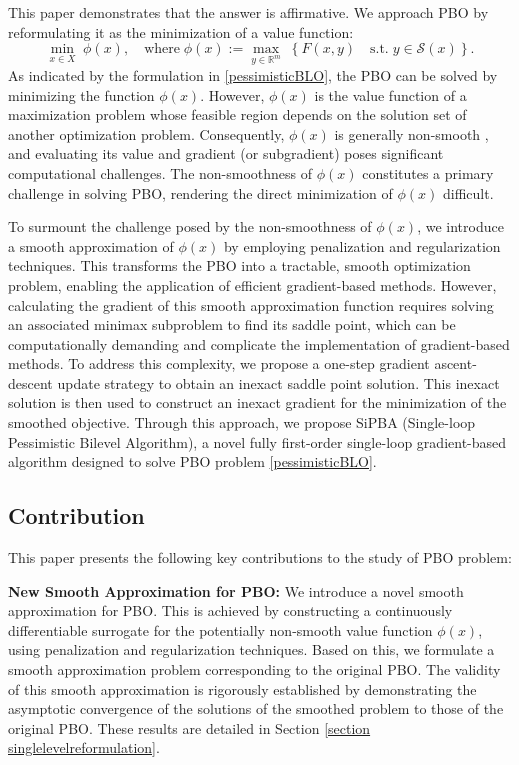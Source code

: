 \documentclass{article}
\def\x{x}
\begin{document}
This paper demonstrates that the answer is affirmative. We approach PBO by reformulating it as the minimization of a value function:
\begin{equation}\label{pessimisticBLO}
		\min_{x \in {X}} \; \phi(x), \quad \text{where} \; \phi(x) := \max_{y\in \mathbb{R}^m}\; \left\{ F(x, y) \quad \text{s.t.} \; y \in \mathcal{S}(x) \right\}.
\end{equation}
As indicated by the formulation in \eqref{pessimisticBLO}, the PBO can be solved by minimizing the function $\phi(x)$. However, $\phi(x)$ is the value function of a maximization problem whose feasible region depends on the solution set of another optimization problem. Consequently, $\phi(\x)$ is generally non-smooth \cite{guo2024sensitivity}, and evaluating its value and gradient (or subgradient) poses significant computational challenges. The non-smoothness of $\phi(\x)$ constitutes a primary challenge in solving PBO, rendering the direct minimization of $\phi(\x)$ difficult.

To surmount the challenge posed by the non-smoothness of $\phi(\x)$, 
we introduce a smooth approximation of $\phi(\x)$ by employing penalization and regularization techniques. %
This transforms the PBO into a tractable, smooth optimization problem, enabling the application of efficient gradient-based methods. However, calculating the gradient of this smooth approximation function requires solving an associated minimax subproblem to find its saddle point, which can be computationally demanding and complicate the implementation of gradient-based methods. To address this complexity, we propose a one-step gradient ascent-descent update strategy to obtain an inexact saddle point solution. This inexact solution is then used to construct an inexact gradient for the minimization of the smoothed objective. Through this approach, we propose SiPBA (Single-loop Pessimistic Bilevel Algorithm), a novel fully first-order single-loop gradient-based algorithm designed to solve PBO problem \eqref{pessimisticBLO}. 

\subsection{Contribution}
This paper presents the following key contributions to the study of PBO problem:

\textbf{New Smooth Approximation for PBO: }
We introduce a novel smooth approximation for PBO. This is achieved by constructing a continuously differentiable surrogate for the potentially non-smooth value function $\phi(\x)$, using penalization and regularization techniques. Based on this, we formulate a smooth approximation problem corresponding to the original PBO. The validity of this smooth approximation is rigorously established by demonstrating the asymptotic convergence of the solutions of the smoothed problem to those of the original PBO. These results are detailed in Section \ref{section singlelevelreformulation}.
\end{document}
